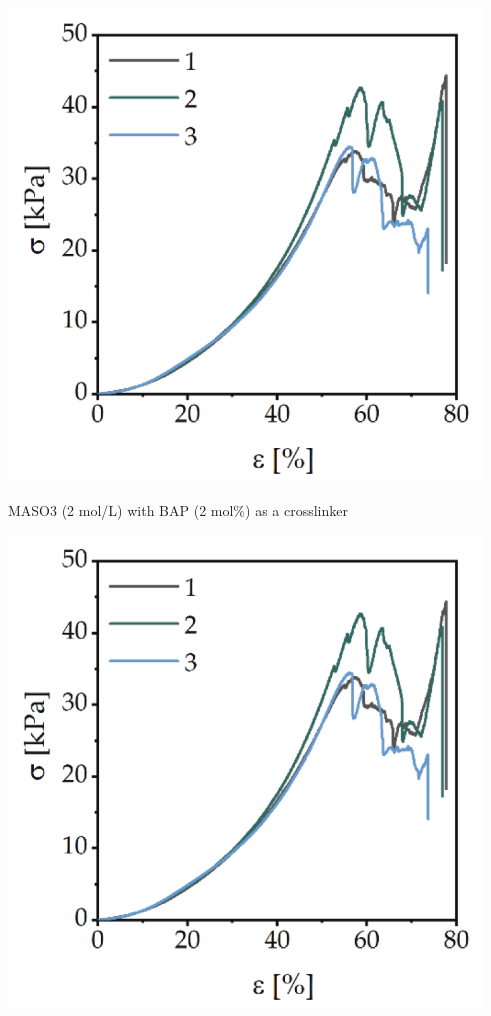 \begin{minipage}[c]{\textwidth}
\centering
\begin{minipage}[c]{0.45\textwidth}
    \includegraphics[width=\textwidth]{figs/mechResponse/2c.png}

    MASO3 (2 mol/L) with BAP (2 mol\%) as a crosslinker
\end{minipage}
\begin{minipage}[c]{0.45\textwidth}
    \includegraphics[width=\textwidth]{figs/mechResponse/2c.png}


\end{minipage}
\end{minipage}
